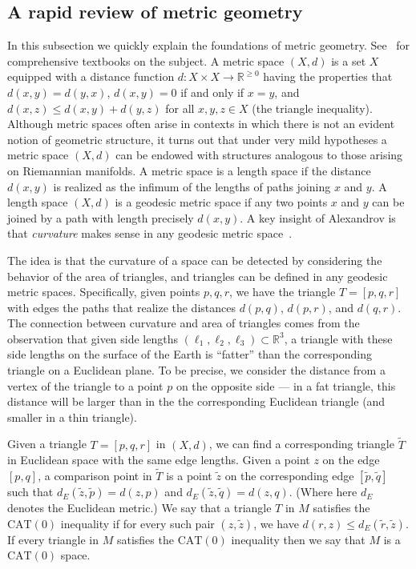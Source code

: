 \documentclass[a4paper,11pt]{article}
\newcommand{\CAT}{\textrm{CAT}}
\begin{document}
\subsection{A rapid review of metric geometry}

In this subsection we quickly explain the foundations of metric geometry.
See~\cite{bridson99, burago01} for comprehensive textbooks on the subject.
A metric space $(X,d)$ is a set $X$ equipped with a distance function $d \colon X \times X \to \mathbb{R}^{\geq 0}$ having the properties that $d(x,y) = d(y,x)$, $d(x,y) = 0$ if and only if $x = y$, and $d(x,z) \leq d(x,y) + d(y,z)$ for all $x,y,z \in X$ (the triangle inequality).
Although metric spaces often arise in contexts in which there is not an evident notion of geometric structure, it turns out that under very mild hypotheses a metric space $(X,d)$ can be endowed with structures analogous to those arising on Riemannian manifolds.
A metric space is a length space if the distance $d(x,y)$ is realized as the infimum of the lengths of paths joining $x$ and $y$.
A length space $(X,d)$ is a geodesic metric space if any two points $x$ and $y$ can be joined by a path with length precisely $d(x,y)$.
A key insight of Alexandrov is that {\em curvature} makes sense in any geodesic metric space~\cite{alexandrov1957uber}.

The idea is that the curvature of a space can be detected by considering the behavior of the area of triangles, and triangles can be defined in any geodesic metric spaces.
Specifically, given points $p, q, r$, we have the triangle $T = [p,q,r]$ with edges the paths that realize the distances $d(p,q)$, $d(p,r)$, and $d(q,r)$.
The connection between curvature and area of triangles comes from the observation that given side lengths $(\ell_1, \ell_2, \ell_3) \subset \mathbb{R}^3$, a triangle with these side lengths on the surface of the Earth is ``fatter'' than the corresponding triangle on a Euclidean plane.
To be precise, we consider the distance from a vertex of the triangle to a point $p$ on the opposite side --- in a fat triangle, this distance will be larger than in the the corresponding Euclidean triangle (and smaller in a thin triangle).

Given a triangle $T=[p,q,r]$ in $(X,d)$, we can find a corresponding triangle $\tilde{T}$ in Euclidean space with the same edge lengths.
Given a point $z$ on the edge $[p,q]$, a comparison point in $\tilde{T}$ is a point $\tilde{z}$ on the corresponding edge $[\tilde{p}, \tilde{q}]$ such that $d_E(\tilde{z}, \tilde{p}) = d(z,p)$ and $d_E(\tilde{z},\tilde{q}) = d(z,q)$.
(Where here $d_E$ denotes the Euclidean metric.)
We say that a triangle $T$ in $M$ satisfies the $\CAT(0)$ inequality if for every such pair $(z, \tilde{z})$, we have $d(r,z) \leq d_E(\tilde{r},\tilde{z})$.
If every triangle in $M$ satisfies the $\CAT(0)$ inequality then we say that $M$ is a $\CAT(0)$ space.
\end{document}
